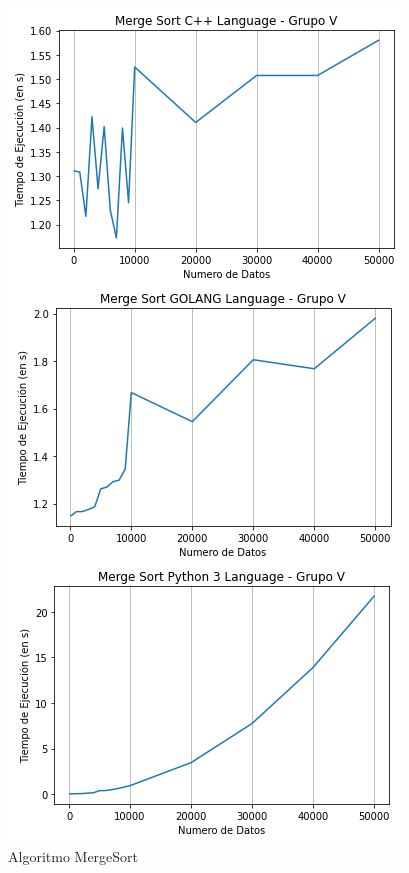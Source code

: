 \documentclass{article}
\begin{document}
 
    \begin{figure}[h!]
        \centering
        \includegraphics[scale=0.6]{img/finalmerg.png}
        \caption{Algoritmo MergeSort}
        \label{fig:my_label}
    \end{figure}
\end{document}
